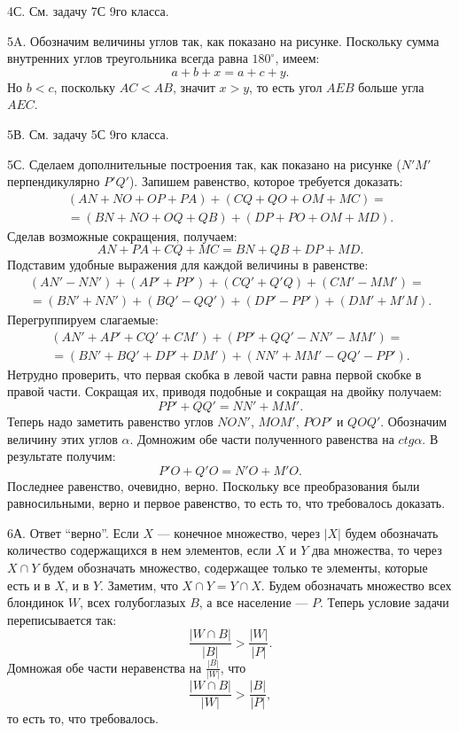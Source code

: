 \documentclass[12pt]{amsart}
\theoremstyle{definition}
\theoremstyle{remark}
\theoremstyle{plain}
\begin{document}
4С. См. задачу 7С 9го класса.

5A. Обозначим величины углов так, как показано на рисунке. Поскольку сумма внутренних углов треугольника всегда равна $180^{\circ}$, имеем:
$$
a+b+x=a+c+y.
$$
Но $b<c$, поскольку $AC<AB$, значит $x>y$, то есть угол $AEB$ больше угла $AEC$.

5В. См. задачу 5С 9го класса.

5С. Сделаем дополнительные построения так, как показано на рисунке ($N'M'$ перпендикулярно $P'Q'$). Запишем равенство, которое требуется доказать:
$$\begin{array}{l}
(AN+NO+OP+PA)+(CQ+QO+OM+MC)=\\
=(BN+NO+OQ+QB)+(DP+PO+OM+MD).
\end{array}$$
Сделав возможные сокращения, получаем:
$$
AN+PA+CQ+MC=BN+QB+DP+MD.
$$
Подставим удобные выражения для каждой величины в равенстве:
$$\begin{array}{l}
(AN'-NN')+(AP'+PP')+(CQ'+Q'Q)+(CM'-MM')=\\
=(BN'+NN')+(BQ'-QQ')+(DP'-PP')+(DM'+M'M).
\end{array}$$
Перегруппируем слагаемые:
$$\begin{array}{l}
(AN'+AP'+CQ'+CM')+(PP'+QQ'-NN'-MM')=\\
=(BN'+BQ'+DP'+DM')+(NN'+MM'-QQ'-PP').
\end{array}$$
Нетрудно проверить, что первая скобка в левой части равна первой скобке в правой части. Сокращая их, приводя подобные и сокращая на двойку получаем:
$$
PP'+QQ'=NN'+MM'.
$$
Теперь надо заметить равенство углов $NON'$, $MOM'$, $POP'$ и $QOQ'$. Обозначим величину этих углов $\alpha$. Домножим обе части полученного равенства на $ctg\alpha$. В результате получим:
$$
P'O+Q'O=N'O+M'O.
$$
Последнее равенство, очевидно, верно. Поскольку все преобразования были равносильными, верно и первое равенство, то есть то, что требовалось доказать.

6А. Ответ "`верно"'. Если $X$ --- конечное множество, через $|X|$ будем обозначать количество содержащихся в нем элементов, если $X$ и $Y$ два множества, то через $X\cap Y$ будем обозначать множество, содержащее только те элементы, которые есть и в $X$, и в $Y$. Заметим, что $X\cap Y=Y\cap X$. Будем обозначать множество всех блондинок $W$, всех голубоглазых $B$, а все население --- $P$. Теперь условие задачи переписывается так:
$$
\frac{|W\cap B|}{|B|}>\frac{|W|}{|P|}.
$$
Домножая обе части неравенства на $\frac{|B|}{|W|}$, что
$$
\frac{|W\cap B|}{|W|}>\frac{|B|}{|P|},
$$
то есть то, что требовалось.
\end{document}
